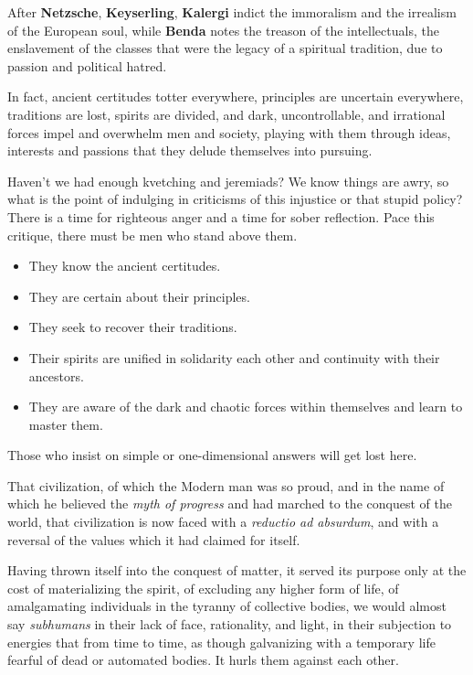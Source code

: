 After \textbf{Netzsche}, \textbf{Keyserling}, \textbf{Kalergi} indict the immoralism and the irrealism of the European soul, while \textbf{Benda} notes the treason of the intellectuals, the enslavement of the classes that were the legacy of a spiritual tradition, due to passion and political hatred. 

In fact, ancient certitudes totter everywhere, principles are uncertain everywhere, traditions are lost, spirits are divided, and dark, uncontrollable, and irrational forces impel and overwhelm men and society, playing with them through ideas, interests and passions that they delude themselves into pursuing.

\begin{quotex}
Haven't we had enough kvetching and jeremiads? We know things are awry, so what is the point of indulging in criticisms of this injustice or that stupid policy? There is a time for righteous anger and a time for sober reflection. Pace this critique, there must be men who stand above them.

\begin{itemize}
\item They know the ancient certitudes. 
\item They are certain about their principles. 
\item They seek to recover their traditions. 
\item Their spirits are unified in solidarity each other and continuity with their ancestors. 
\item They are aware of the dark and chaotic forces within themselves and learn to master them. 
\end{itemize}

Those who insist on simple or one-dimensional answers will get lost here.

\end{quotex}
That civilization, of which the Modern man was so proud, and in the name of which he believed the \emph{myth of progress} and had marched to the conquest of the world, that civilization is now faced with a \emph{reductio ad absurdum}, and with a reversal of the values which it had claimed for itself. 

Having thrown itself into the conquest of matter, it served its purpose only at the cost of materializing the spirit, of excluding any higher form of life, of amalgamating individuals in the tyranny of collective bodies, we would almost say \emph{subhumans} in their lack of face, rationality, and light, in their subjection to energies that from time to time, as though galvanizing with a temporary life fearful of dead or automated bodies. It hurls them against each other. 

